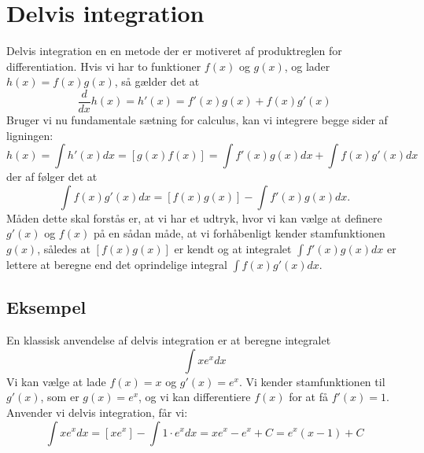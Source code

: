 \documentclass{article}
\theoremstyle{definition}
\theoremstyle{remark}
\begin{document}
\begin{titlepage}
\end{titlepage}



\section*{Delvis integration}
Delvis integration en en metode der er motiveret af produktreglen for differentiation. Hvis vi har to funktioner $f(x)$ og $g(x)$, og lader $h(x) = f(x)g(x)$, så gælder det at
\begin{equation}
    \frac{d}{dx} h(x) = h'(x) = f'(x)g(x) + f(x)g'(x)
\end{equation}
Bruger vi nu fundamentale sætning for calculus, kan vi integrere begge sider af ligningen:
\begin{equation}
    h(x) = \int h'(x)  dx = [g(x)f(x)] = \int f'(x)g(x) dx + \int f(x)g'(x) dx
\end{equation}
der af følger det at
\begin{equation}
    \int f(x)g'(x) dx = [f(x)g(x)] - \int f'(x)g(x) dx.
    \end{equation}  
Måden dette skal forstås er, at vi har et udtryk, hvor vi kan vælge at definere $g'(x)$ og $f(x)$ på en sådan måde, at vi forhåbenligt kender stamfunktionen $g(x)$, således at $[f(x)g(x)]$ er kendt og at integralet $\int f'(x)g(x) dx$ er lettere at beregne end det oprindelige integral $\int f(x)g'(x) dx$.
\subsection*{Eksempel}
En klassisk anvendelse af delvis integration er at beregne integralet
\begin{equation}
    \int x e^x dx
\end{equation}
Vi kan vælge at lade $f(x) = x$ og $g'(x) = e^x$. Vi kender stamfunktionen til $g'(x)$, som er $g(x) = e^x$, og vi kan differentiere $f(x)$ for at få $f'(x) = 1$. Anvender vi delvis integration, får vi:
\begin{equation}
    \int x e^x dx = [x e^x] - \int 1 \cdot e^x dx = x e^x - e^x + C = e^x(x - 1) + C
    \end{equation}
\end{document}

